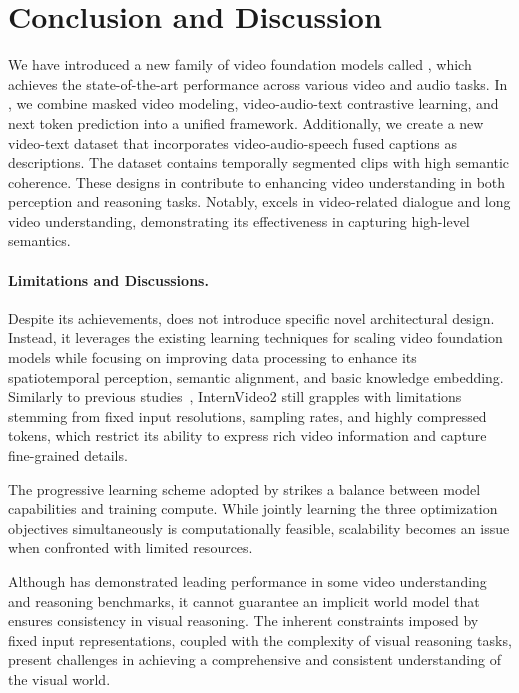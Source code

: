 \section{Conclusion and Discussion}
We have introduced a new family of video foundation models called {\modelname}, which achieves the state-of-the-art performance across various video and audio tasks. In {\modelname}, we combine masked video modeling, video-audio-text contrastive learning, and next token prediction into a unified framework. Additionally, we create a new video-text dataset that incorporates video-audio-speech fused captions as descriptions. The dataset contains temporally segmented clips with high semantic coherence.
These designs in {\modelname} contribute to enhancing video understanding in both perception and reasoning tasks. Notably, {\modelname} excels in video-related dialogue and long video understanding, demonstrating its effectiveness in capturing high-level semantics.

\paragraph{Limitations and Discussions.} Despite its achievements, {\modelname} does not introduce specific novel architectural design. Instead, it leverages the existing learning techniques for scaling video foundation models while focusing on improving data processing to enhance its spatiotemporal perception, semantic alignment, and basic knowledge embedding. Similarly to previous studies~\cite{umt,mplugowl}, InternVideo2 still grapples with limitations stemming from fixed input resolutions, sampling rates, and highly compressed tokens, which restrict its ability to express rich video information and capture fine-grained details.

The progressive learning scheme adopted by {\modelname} strikes a balance between model capabilities and training compute. While jointly learning the three optimization objectives simultaneously is computationally feasible, scalability becomes an issue when confronted with limited resources.

Although {\modelname} has demonstrated leading performance in some video understanding and reasoning benchmarks, it cannot guarantee an implicit world model that ensures consistency in visual reasoning. The inherent constraints imposed by fixed input representations, coupled with the complexity of visual reasoning tasks, present challenges in achieving a comprehensive and consistent understanding of the visual world.

